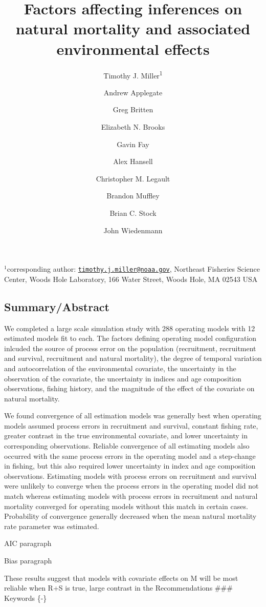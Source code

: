 \documentclass[
  12pt,
]{article}
\title{Factors affecting inferences on natural mortality and associated
environmental effects}
\author{Timothy J. Miller\textsuperscript{1} \and Andrew
Applegate \and Greg Britten \and Elizabeth N. Brooks \and Gavin
Fay \and Alex Hansell \and Christopher M. Legault \and Brandon
Muffley \and Brian C. Stock \and John Wiedenmann}
\date{}
\begin{document}
\maketitle

\(^1\)corresponding author:
\href{mailto:timothy.j.miller@noaa.gov}{\nolinkurl{timothy.j.miller@noaa.gov}},
Northeast Fisheries Science Center, Woods Hole Laboratory, 166 Water
Street, Woods Hole, MA 02543 USA\\

\pagebreak

\hypertarget{summaryabstract}{%
\subsection*{Summary/Abstract}\label{summaryabstract}}

We completed a large scale simulation study with 288 operating models
with 12 estimated models fit to each. The factors defining operating
model configuration inlcuded the source of process error on the
population (recruitment, recruitment and survival, recruitment and
natural mortality), the degree of temporal variation and autocorrelation
of the environmental covariate, the uncertainty in the observation of
the covariate, the uncertainty in indices and age composition
observations, fishing history, and the magnitude of the effect of the
covariate on natural mortality.

We found convergence of all estimation models was generally best when
operating models assumed process errors in recruitment and survival,
constant fishing rate, greater contrast in the true environmental
covariate, and lower uncertainty in corresponding observations. Reliable
convergence of all estimating models also occurred with the same process
errors in the operating model and a step-change in fishing, but this
also required lower uncertainty in index and age composition
observations. Estimating models with process errors on recruitment and
survival were unlikely to converge when the process errors in the
operating model did not match whereas estimating models with process
errors in recruitment and natural mortality converged for operating
models without this match in certain cases. Probability of convergence
generally decreased when the mean natural mortality rate parameter was
estimated.

AIC paragraph

Bias paragraph

These results suggest that models with covariate effects on M will be
most reliable when R+S is true, large contrast in the Recommendations
\#\#\# Keywords \{-\}
\end{document}
